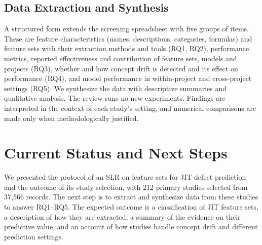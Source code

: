 \documentclass[sigconf,review]{acmart}
\begin{document}
\subsection{Data Extraction and Synthesis}
\label{subsec:data-extraction}

A structured form extends the screening spreadsheet with five groups of items. These are feature characteristics (names, descriptions, categories, formulas) and feature sets with their extraction methods and tools (RQ1, RQ2), performance metrics, reported effectiveness and contribution of feature sets, models and projects (RQ3), whether and how concept drift is detected and its effect on performance (RQ4), and model performance in within-project and cross-project settings (RQ5). We synthesize the data with descriptive summaries and qualitative analysis. The review runs no new experiments. Findings are interpreted in the context of each study's setting, and numerical comparisons are made only when methodologically justified.

\section{Current Status and Next Steps}
\label{S:status}

We presented the protocol of an SLR on feature sets for JIT defect prediction and the outcome of its study selection, with 212 primary studies selected from 37,566 records. The next step is to extract and synthesize data from these studies to answer RQ1--RQ5. The expected outcome is a classification of JIT feature sets, a description of how they are extracted, a summary of the evidence on their predictive value, and an account of how studies handle concept drift and different prediction settings.



\end{document}
